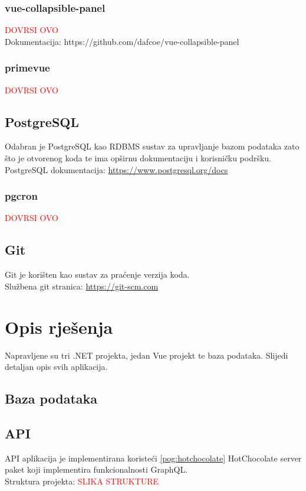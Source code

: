 \documentclass[zavrsnirad]{fer}
\begin{document}
\subsection{vue-collapsible-panel}
\label{pog:vue_collapsible_panel}
\textcolor{red}{DOVRSI OVO}
\\Dokumentacija: https://github.com/dafcoe/vue-collapsible-panel

\subsection{primevue}
\textcolor{red}{DOVRSI OVO}

\section{PostgreSQL}
Odabran je PostgreSQL kao RDBMS sustav za upravljanje bazom podataka zato što je otvorenog koda te ima opširnu dokumentaciju i korisničku podršku.
\\PostgreSQL dokumentacija: \url{https://www.postgresql.org/docs}

\subsection{pgcron}
\textcolor{red}{DOVRSI OVO}

\section{Git}
Git je korišten kao sustav za praćenje verzija koda.
\\Službena git stranica: \url{https://git-scm.com}


\chapter{Opis rješenja}
\label{pog:opis_rjesenja}
Napravljene su tri .NET projekta, jedan Vue projekt te baza podataka. Slijedi detaljan opis svih aplikacija.

\section{Baza podataka}

\section{API}
API aplikacija je implementirana koristeći \ref{pog:hotchocolate} HotChocolate server paket koji implementira funkcionalnosti GraphQL.
\\Struktura projekta:
\textcolor{red}{SLIKA STRUKTURE}
\end{document}

